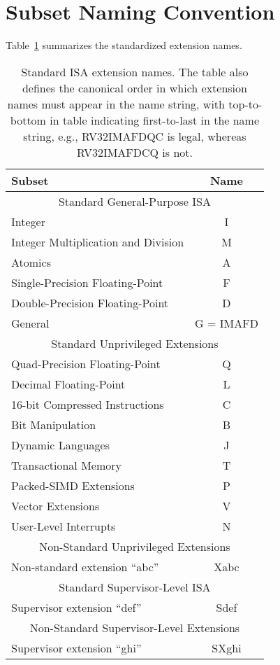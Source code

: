 \section{Subset Naming Convention}
Table~\ref{isanametable} summarizes the standardized extension names.
~\\
\begin{table}[h]
\center
\begin{tabular}{|l|c|}
\hline
Subset & Name \\
\hline
\hline
\multicolumn{2}{|c|}{Standard General-Purpose ISA}\\
\hline
Integer & I \\
Integer Multiplication and Division & M \\
Atomics & A \\
Single-Precision Floating-Point & F \\
Double-Precision Floating-Point & D \\
\hline
General & G = IMAFD \\
\hline
\multicolumn{2}{|c|}{Standard Unprivileged Extensions}\\
\hline
Quad-Precision Floating-Point & Q \\
Decimal Floating-Point & L \\
16-bit Compressed Instructions & C \\
Bit Manipulation & B \\
Dynamic Languages & J \\
Transactional Memory & T \\
Packed-SIMD Extensions & P \\
Vector Extensions & V \\
User-Level Interrupts & N \\
\hline
\hline
\multicolumn{2}{|c|}{Non-Standard Unprivileged Extensions}\\
\hline
Non-standard extension ``abc'' & Xabc \\
\hline
\hline
\multicolumn{2}{|c|}{Standard Supervisor-Level ISA}\\
\hline
Supervisor extension ``def'' & Sdef \\
\hline
\hline
\multicolumn{2}{|c|}{Non-Standard Supervisor-Level Extensions}\\
\hline
Supervisor extension ``ghi'' & SXghi \\
\hline
\end{tabular}
\caption{Standard ISA extension names.  The table also defines the
  canonical order in which extension names must appear in the name
  string, with top-to-bottom in table indicating first-to-last in the
  name string, e.g., RV32IMAFDQC is legal, whereas RV32IMAFDCQ is not.}
\label{isanametable}
\end{table}


